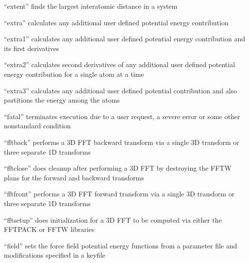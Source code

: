 \documentclass[letterpaper,11pt,english]{sphinxmanual}
\begin{document}

“extent” finds the largest interatomic distance in a system


“extra” calculates any additional user defined potential
energy contribution


“extra1” calculates any additional user defined potential
energy contribution and its first derivatives


“extra2” calculates second derivatives of any additional
user defined potential energy contribution for a single
atom at a time


“extra3” calculates any additional user defined potential
contribution and also partitions the energy among the atoms


“fatal” terminates execution due to a user request, a severe
error or some other nonstandard condition


“fftback” performs a 3\sphinxhyphen{}D FFT backward transform via a single
3\sphinxhyphen{}D transform or three separate 1\sphinxhyphen{}D transforms


“fftclose” does cleanup after performing a 3\sphinxhyphen{}D FFT by destroying
the FFTW plans for the forward and backward transforms


“fftfront” performs a 3\sphinxhyphen{}D FFT forward transform via a single
3\sphinxhyphen{}D transform or three separate 1\sphinxhyphen{}D transforms


“fftsetup” does initialization for a 3\sphinxhyphen{}D FFT to be computed
via either the FFTPACK or FFTW libraries


“field” sets the force field potential energy functions from
a parameter file and modifications specified in a keyfile

\end{document}
